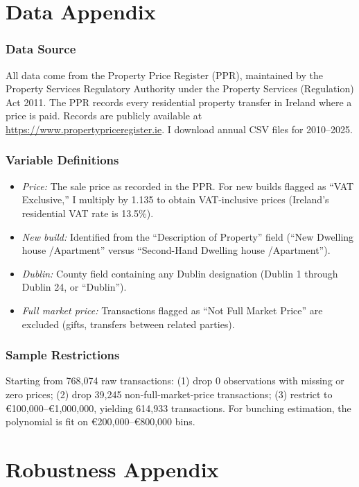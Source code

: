 \documentclass[12pt]{article}
\newcommand{\eur}[1]{\euro{}#1}
\begin{document}
\newpage
\appendix

\section{Data Appendix}

\subsubsection*{Data Source} All data come from the Property Price Register (PPR), maintained by the Property Services Regulatory Authority under the Property Services (Regulation) Act 2011. The PPR records every residential property transfer in Ireland where a price is paid. Records are publicly available at \url{https://www.propertypriceregister.ie}. I download annual CSV files for 2010--2025.

\subsubsection*{Variable Definitions}
\begin{itemize}
\item \textit{Price:} The sale price as recorded in the PPR. For new builds flagged as ``VAT Exclusive,'' I multiply by 1.135 to obtain VAT-inclusive prices (Ireland's residential VAT rate is 13.5\%).
\item \textit{New build:} Identified from the ``Description of Property'' field (``New Dwelling house /\allowbreak Apartment'' versus ``Second-Hand Dwelling house /\allowbreak Apartment'').
\item \textit{Dublin:} County field containing any Dublin designation (Dublin 1 through Dublin 24, or ``Dublin'').
\item \textit{Full market price:} Transactions flagged as ``Not Full Market Price'' are excluded (gifts, transfers between related parties).
\end{itemize}

\subsubsection*{Sample Restrictions}
Starting from 768,074 raw transactions: (1) drop 0 observations with missing or zero prices; (2) drop 39,245 non-full-market-price transactions; (3) restrict to \eur{100,000}--\eur{1,000,000}, yielding 614,933 transactions. For bunching estimation, the polynomial is fit on \eur{200,000}--\eur{800,000} bins.

\section{Robustness Appendix}
\end{document}
